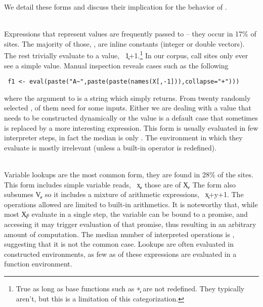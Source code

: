\documentclass[review,screen,acmsmall,anonymous=true]{acmart}
\begin{document}
We detail these forms and discuss their implication for the behavior of \eval.

\newcommand{\EE}[1]{{{\emph{\framebox{#1}}}}\\[1mm]}

\medskip\noindent\EE{$min(e)=\c{V}$} Expressions that represent values are
frequently passed to \eval -- they occur in 17\% of sites. The majority of
those, \packageValOneNodePercent, are inline constants (integer or double
vectors). The rest trivially evaluate to a value, \eg~\c{1+1}.\footnote{True as
long as base functions such as \c{+} are not redefined. They typically aren't,
but this is a limitation of this categorization.} In our corpus,
\packageNbCallSitesUniqueActualValue call sites only ever see a simple value.
Manual inspection reveals cases such as the following
\begin{lstlisting}
 f1 <- eval(paste("A~",paste(paste(names(X[,-1])),collapse="+")))
\end{lstlisting}
where the argument to \eval is a string which \eval simply returns. From twenty
randomly selected \evals, \packageUsefulValueEvalPercent of them  need %
\eval for some inputs. Either we are dealing with a value that needs to be
constructed dynamically or the value is a default case that sometimes is
replaced by a more interesting expression. This form is usually evaluated in few
interpreter steps, in fact the median is only
\packageMinimizedmedianoperationscRnd. The environment in which they evaluate is
mostly irrelevant (unless a built-in operator is redefined).

\medskip\noindent\EE{$min(e)=\c{X}$} Variable lookups are the most common form,
they are found in 28\% of the sites. This form includes simple variable reads,
\eg~\c{x}, those are \packageNbSymbolVarSitePercent of \c X. The form also
subsumes \c{V}, so it includes a mixture of arithmetic expressions,
\eg~\c{x+y+1}. The operations allowed are limited to built-in arithmetics. It is
noteworthy that, while most \c{X}\!s evaluate in a single step, the variable can
be bound to a promise, and accessing it may trigger evaluation of that promise,
thus resulting in an arbitrary amount of computation. The median number of
interpreted operations is \packageMinimizedmedianoperationsaRnd, suggesting that
it is not the common case. Lookups are often evaluated in constructed
environments, as few as \packageMinimizedpercentparentframesc of these
expressions are evaluated in a function environment.
\end{document}
